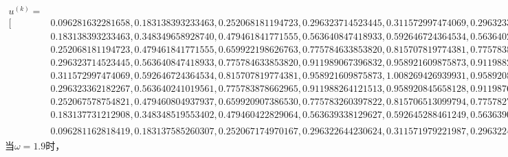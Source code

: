 \documentclass[10pt,a4paper]{article}
\begin{document}
\begin{align*}
u^{(k)}=&\\
[&0.096281632281658,0.183138393233463,0.252068181194723,0.296323714523445,0.311572997474069,0.296323362182267,0.252067578754821,0.183137731212908,0.096281162818419,\\
&0.183138393233463,0.348349658928740,0.479461841771555,0.563640847418933,0.592646724364534,0.563640241019561,0.479460804937937,0.348348519553402,0.183137585260307,\\
&0.252068181194723,0.479461841771555,0.659922198626763,0.775784633853820,0.815707819774381,0.775783878662965,0.659920907386530,0.479460422829064,0.252067174970167,\\
&0.296323714523445,0.563640847418933,0.775784633853820,0.911989067396832,0.958921609875873,0.911988264121513,0.775783260397822,0.563639338129627,0.296322644230624,\\
&0.311572997474069,0.592646724364534,0.815707819774381,0.958921609875873,1.008269426939931,0.958920845658129,0.815706513099794,0.592645288461249,0.311571979221987,\\
&0.296323362182267,0.563640241019561,0.775783878662965,0.911988264121513,0.958920845658128,0.911987606490231,0.775782754232017,0.563639005383613,0.296322485947155,\\
&0.252067578754821,0.479460804937937,0.659920907386530,0.775783260397822,0.815706513099794,0.775782754232017,0.659920041934245,0.479459853893360,0.252066904333966,\\
&0.183137731212908,0.348348519553402,0.479460422829064,0.563639338129627,0.592645288461249,0.563639005383613,0.479459853893360,0.348347894350573,0.183137287858479,\\
&0.096281162818419,0.183137585260307,0.252067174970167,0.296322644230624,0.311571979221987,0.296322485947155,0.252066904333966,0.183137287858479,0.096280951919793]^T
\end{align*}
\normalsize
当$\omega=1.9$时，
\tiny
\end{document}
